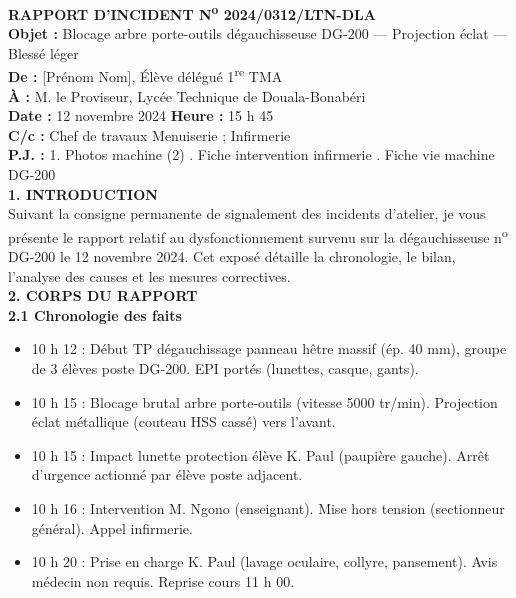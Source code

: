 \documentclass[11pt]{article}
\begin{document}
\begin{corrige}
\textbf{RAPPORT D'INCIDENT N\textsuperscript{o} 2024/0312/LTN-DLA} \\[1mm]
\textbf{Objet :} Blocage arbre porte-outils dégauchisseuse DG-200 — Projection éclat — Blessé léger \\[1mm]
\textbf{De :} [Prénom Nom], Élève délégué 1\textsuperscript{re} TMA \\
\textbf{À :} M. le Proviseur, Lycée Technique de Douala-Bonabéri \\
\textbf{Date :} 12 novembre 2024 \hfill \textbf{Heure :} 15 h 45 \\
\textbf{C/c :} Chef de travaux Menuiserie ; Infirmerie \\
\textbf{P.J. :} 1. Photos machine (2) . Fiche intervention infirmerie . Fiche vie machine DG-200 \\[2mm]

\textbf{1. INTRODUCTION} \\
Suivant la consigne permanente de signalement des incidents d'atelier, je vous présente le rapport relatif au dysfonctionnement survenu sur la dégauchisseuse n\textsuperscript{o} DG-200 le 12 novembre 2024. Cet exposé détaille la chronologie, le bilan, l'analyse des causes et les mesures correctives. \\[2mm]

\textbf{2. CORPS DU RAPPORT} \\
\textbf{2.1 Chronologie des faits} \\
\begin{itemize}
    \item 10 h 12 : Début TP dégauchissage panneau hêtre massif (ép. 40 mm), groupe de 3 élèves poste DG-200. EPI portés (lunettes, casque, gants).
    \item 10 h 15 : Blocage brutal arbre porte-outils (vitesse 5000 tr/min). Projection éclat métallique (couteau HSS cassé) vers l'avant.
    \item 10 h 15 : Impact lunette protection élève K. Paul (paupière gauche). Arrêt d'urgence actionné par élève poste adjacent.
    \item 10 h 16 : Intervention M. Ngono (enseignant). Mise hors tension (sectionneur général). Appel infirmerie.
    \item 10 h 20 : Prise en charge K. Paul (lavage oculaire, collyre, pansement). Avis médecin non requis. Reprise cours 11 h 00.
\end{itemize}


\end{corrige}
\end{document}

